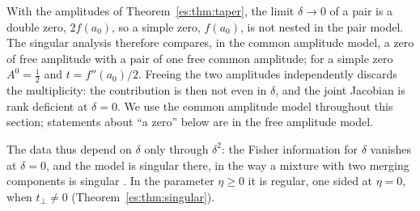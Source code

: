 With the amplitudes of Theorem~\ref{es:thm:taper}, the limit $\delta\to0$ of a pair is a double zero, $2f(a_0)$, so a simple zero, $f(a_0)$, is not nested in the pair model. The singular analysis therefore compares, in the common amplitude model, a zero of free amplitude with a pair of one free common amplitude; for a simple zero $A^0=\tfrac12$ and $t=f''(a_0)/2$. Freeing the two amplitudes independently discards the multiplicity: the contribution is then not even in $\delta$, and the joint Jacobian is rank deficient at $\delta=0$. We use the common amplitude model throughout this section; statements about ``a zero'' below are in the free amplitude model.

The data thus depend on $\delta$ only through $\delta^2$: the Fisher information for $\delta$ vanishes at $\delta=0$, and the model is singular there, in the way a mixture with two merging components is singular \cite{Chen95,Nguyen13}. In the parameter $\eta\ge0$ it is regular, one sided at $\eta=0$, when $t_\perp\ne0$ (Theorem~\ref{es:thm:singular}).


